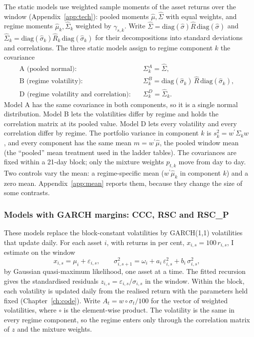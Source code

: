 The static models use weighted sample moments of the asset returns over the window (Appendix~\ref{app:tech}): pooled moments $\hat\mu,\hat\Sigma$ with equal weights, and regime moments $\hat\mu_k,\hat\Sigma_k$ weighted by $\gamma_{s,k}$. Write $\hat\Sigma=\mathrm{diag}(\hat\sigma)\hat R\,\mathrm{diag}(\hat\sigma)$ and $\hat\Sigma_k=\mathrm{diag}(\hat\sigma_k)\hat R_k\,\mathrm{diag}(\hat\sigma_k)$ for their decompositions into standard deviations and correlations. The three static models assign to regime component $k$ the covariance
\begin{align}
\text{A (pooled normal):}&\quad \Sigma^{A}_k=\hat\Sigma,\\
\text{B (regime volatility):}&\quad \Sigma^{B}_k=\mathrm{diag}(\hat\sigma_k)\,\hat R\,\mathrm{diag}(\hat\sigma_k),\\
\text{D (regime volatility and correlation):}&\quad \Sigma^{D}_k=\hat\Sigma_k.
\end{align}
Model A has the same covariance in both components, so it is a single normal distribution. Model B lets the volatilities differ by regime and holds the correlation matrix at its pooled value. Model D lets every volatility and every correlation differ by regime. The portfolio variance in component $k$ is $s_k^2=w^\prime\Sigma_k w$, and every component has the same mean $m=w^\prime\hat\mu$, the pooled window mean (the ``pooled'' mean treatment used in the ladder tables). The covariances are fixed within a 21-day block; only the mixture weights $p_{t,k}$ move from day to day. Two controls vary the mean: a regime-specific mean ($w^\prime\hat\mu_k$ in component $k$) and a zero mean. Appendix~\ref{app:mean} reports them, because they change the size of some contrasts.

\subsubsection{Models with GARCH margins: CCC, RSC and RSC\_P}\label{sec:garch}

These models replace the block-constant volatilities by GARCH(1,1) volatilities that update daily. For each asset $i$, with returns in per cent, $x_{i,s}=100\,r_{i,s}$, I estimate on the window
\begin{equation}
x_{i,s}=\mu_i+\varepsilon_{i,s},\qquad \sigma_{i,s+1}^2=\omega_i+a_i\,\varepsilon_{i,s}^2+b_i\,\sigma_{i,s}^2,
\end{equation}
by Gaussian quasi-maximum likelihood, one asset at a time. The fitted recursion gives the standardised residuals $z_{i,s}=\varepsilon_{i,s}/\sigma_{i,s}$ in the window. Within the block, each volatility is updated daily from the realised return with the parameters held fixed (Chapter~\ref{ch:code}). Write $A_t=w\circ\sigma_t/100$ for the vector of weighted volatilities, where $\circ$ is the element-wise product. The volatility is the same in every regime component, so the regime enters only through the correlation matrix of $z$ and the mixture weights.

